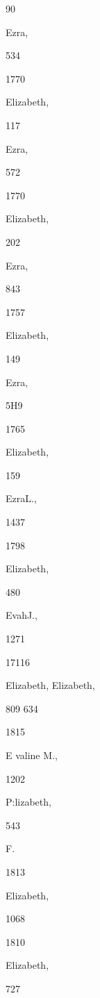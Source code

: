 \documentclass{book}
\begin{document}
90 




Ezra, 


534 


1770 


Elizabeth, 


117 




Ezra, 


572 


1770 


Elizabeth, 


202 




Ezra, 


843 


1757 


Elizabeth, 


149 




Ezra, 


5H9 


1765 


Elizabeth, 


159 




EzraL., 


1437 


1798 


Elizabeth, 


480 




EvahJ., 


1271 


17116 


Elizabeth, 
Elizabeth, 


809 
634 


1815 


E valine M., 


1202 




P:lizabeth, 


543 




F. 




1813 


Elizabeth, 


1068 








1810 


Elizabeth, 


727 
\end{document}

